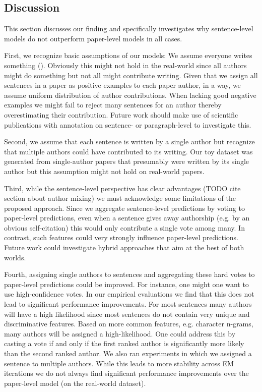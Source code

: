 \subsection{Discussion}
This section discusses our finding and specifically investigates why sentence-level models do not outperform paper-level models in all cases.

First, we recognize basic assumptions of our models:
We assume everyone writes something (). 
Obviously this might not hold in the real-world since all authors might do something but not all might contribute writing.
Given that we assign all sentences in a paper as positive examples to each paper author, in a way, we assume uniform distribution of author contributions.
When lacking good negative examples we might fail to reject many sentences for an author thereby overestimating their contribution.
Future work should make use of scientific publications with annotation on sentence- or paragraph-level to investigate this.

Second, we assume that each sentence is written by a single author but recognize that multiple authors could have contributed to its writing.
Our toy dataset was generated from single-author papers that presumably were written by its single author but this assumption might not hold on real-world papers.

Third, while the sentence-level perspective has clear advantages (TODO cite section about author mixing) we must acknowledge some limitations of the proposed approach.
Since we aggregate sentence-level predictions by voting to paper-level predictions, even when a sentence gives away authorship (e.g. by an obvious self-citation) this would only contribute a single vote among many.
In contrast, such features could very strongly influence paper-level predictions.
Future work could investigate hybrid approaches that aim at the best of both worlds.

Fourth, assigning single authors to sentences and aggregating these hard votes to paper-level predictions could be improved.
For instance, one might one want to use high-confidence votes. 
In our empirical evaluations we find that this does not lead to significant performance improvements.
For most sentences many authors will have a high likelihood since most sentences do not contain very unique and discriminative features.
Based on more common features, e.g. character n-grams, many authors will be assigned a high-likelihood.
One could address this by casting a vote if and only if the first ranked author is significantly more likely than the second ranked author.
We also ran experiments in which we assigned a sentence to multiple authors. While this leads to more stability across EM iterations we do not always find significant performance improvements over the paper-level model (on the real-world dataset).


